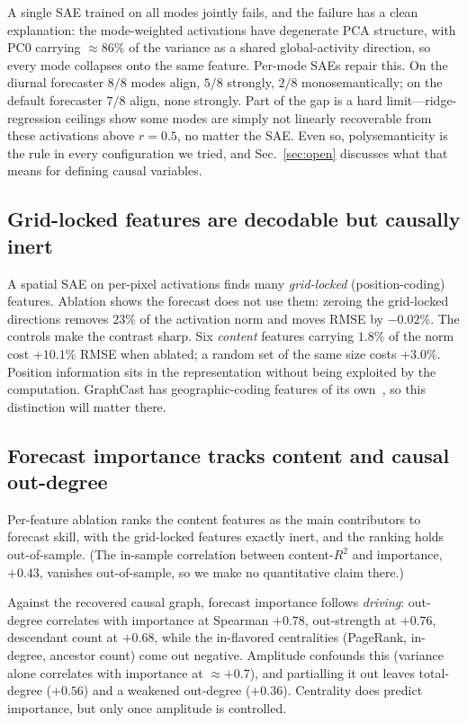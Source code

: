 A single SAE trained on all modes jointly fails, and the failure has a clean
explanation: the mode-weighted activations have degenerate PCA structure, with PC0
carrying ${\approx}86\%$ of the variance as a shared global-activity direction, so
every mode collapses onto the same feature. Per-mode SAEs repair this. On the
diurnal forecaster $8/8$ modes align, $5/8$ strongly, $2/8$ monosemantically; on
the default forecaster $7/8$ align, none strongly. Part of the gap is a hard
limit---ridge-regression ceilings show some modes are simply not linearly
recoverable from these activations above $r=0.5$, no matter the SAE. Even so,
polysemanticity is the rule in every configuration we tried, and
Sec.~\ref{sec:open} discusses what that means for defining causal variables.

\subsection{Grid-locked features are decodable but causally inert}
\label{sec:gridlock-cnn}

A spatial SAE on per-pixel activations finds many \emph{grid-locked}
(position-coding) features. Ablation shows the forecast does not use them: zeroing
the grid-locked directions removes $23\%$ of the activation norm and moves RMSE by
$-0.02\%$. The controls make the contrast sharp. Six \emph{content} features
carrying $1.8\%$ of the norm cost $+10.1\%$ RMSE when ablated; a random set of the
same size costs $+3.0\%$. Position information sits in the representation without
being exploited by the computation. GraphCast has geographic-coding features of its
own~\cite{macmillan2025}, so this distinction will matter there.

\subsection{Forecast importance tracks content and causal out-degree}

Per-feature ablation ranks the content features as the main contributors to
forecast skill, with the grid-locked features exactly inert, and the ranking holds
out-of-sample. (The in-sample correlation between content-$R^2$ and importance,
$+0.43$, vanishes out-of-sample, so we make no quantitative claim there.)

Against the recovered causal graph, forecast importance follows \emph{driving}:
out-degree correlates with importance at Spearman $+0.78$, out-strength at $+0.76$,
descendant count at $+0.68$, while the in-flavored centralities (PageRank,
in-degree, ancestor count) come out negative. Amplitude confounds this (variance
alone correlates with importance at ${\approx}+0.7$), and partialling it out leaves
total-degree ($+0.56$) and a weakened out-degree ($+0.36$). Centrality does predict
importance, but only once amplitude is controlled.

